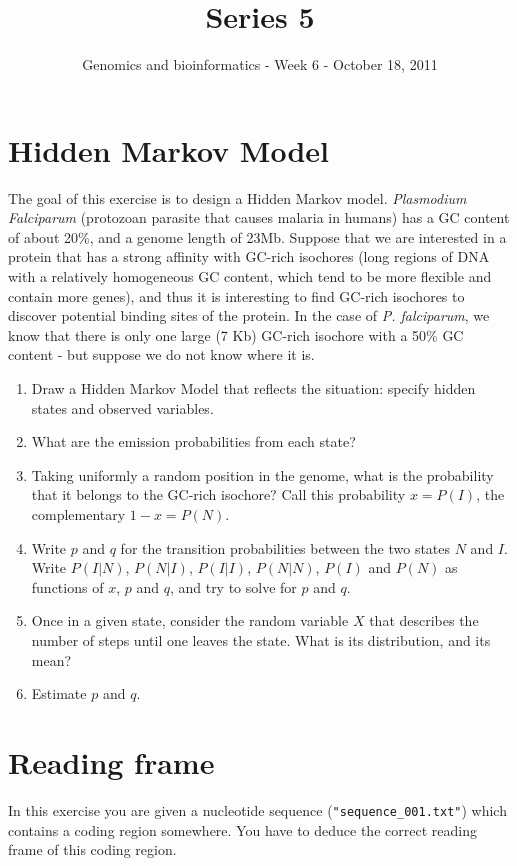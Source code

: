 \documentclass[a4paper,11pt]{article}
\title{Series 5}
\date{}
\author{Genomics and bioinformatics - Week 6 - October 18, 2011}
\begin{document}
\maketitle

\section{Hidden Markov Model}
The goal of this exercise is to design a Hidden Markov model. \emph{Plasmodium Falciparum} (protozoan parasite that causes malaria in humans) has a GC content of about 20\%, and a genome length of 23Mb. Suppose that we are interested in a protein that has a strong affinity with GC-rich isochores (long regions of DNA with a relatively homogeneous GC content, which tend to be more flexible and contain more genes), and thus it is interesting to find GC-rich isochores to discover potential binding sites of the protein. In the case of \emph{P. falciparum}, we know that there is only one large (7 Kb) GC-rich isochore with a 50\% GC content - but suppose we do not know where it is.
\begin{enumerate}
\item Draw a Hidden Markov Model that reflects the situation: specify hidden states and observed variables.
\item What are the emission probabilities from each state?
\item Taking uniformly a random position in the genome, what is the probability that it belongs to the GC-rich isochore? Call this probability $x = P(I)$, the complementary $1-x = P(N)$.
\item Write $p$ and $q$ for the transition probabilities between the two states $N$ and $I$. Write $P(I|N)$, $P(N|I)$, $P(I|I)$, $P(N|N)$, $P(I)$ and $P(N)$ as functions of $x$, $p$ and $q$, and try to solve for $p$ and $q$.
\item Once in a given state, consider the random variable $X$ that describes the number of steps until one leaves the state. What is its distribution, and its mean?
\item Estimate $p$ and $q$.
\end{enumerate}

\section{Reading frame}
In this exercise you are given a nucleotide sequence (\texttt{"sequence\_001.txt"}) which contains a coding region somewhere. You have to deduce the correct reading frame of this coding region.
\end{document}
